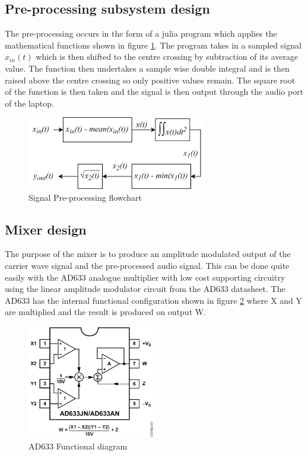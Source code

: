 \subsection{Pre-processing subsystem design}
The pre-processing occurs in the form of a julia program which applies the mathematical functions shown in figure \ref{fig:sigpreprocessflow}. The program takes in a sampled signal $x_{in}(t)$ which is then shifted to the centre crossing by subtraction of its average value. The function then undertakes a sample wise double integral and is then raised above the centre crossing so only positive values remain. The square root of the function is then taken and the signal is then output through the audio port of the laptop.
\begin{figure}[ht!]
    \centering
    \includegraphics[width=0.7\textwidth]{Figures/Design/Preprocessing Design.png}
    \caption{Signal Pre-processing flowchart}
    \label{fig:sigpreprocessflow}
\end{figure}


\subsection{Mixer design}
The purpose of the mixer is to produce an amplitude modulated output of the carrier wave signal and the pre-processed audio signal. This can be done quite easily with the AD633 analogue multiplier with low cost supporting circuitry using the linear amplitude modulator circuit from the AD633 datasheet. The AD633 has the internal functional configuration shown in figure \ref{fig:mixerfunc} where X and Y are multiplied and the result is produced on output W.

\begin{figure}[ht!]
    \centering
    \includegraphics[width=0.5\textwidth]{Figures/Design/Mixer/ad633Intr.png}
    \caption{AD633 Functional diagram}
    \label{fig:mixerfunc}
\end{figure}

